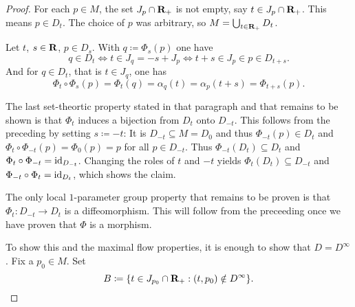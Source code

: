 \begin{proof}
  For
  each $p \in M$, the set $J_p \cap \mathbf{R}_+$ is not empty, say $t \in J_p
  \cap \mathbf{R}_+$. This means $p \in D_t$. The choice of $p$ was arbitrary, so
  $M = \bigcup_{t \in \mathbf{R}_+} D_t$.
  
  Let $t$, $s \in \mathbf{R}$, $p \in D_s$. With $q \coloneqq \Phi_s(p)$ one have
  \[
    q \in D_t \iff t \in J_q = -s + J_p \iff t + s \in J_p \in p \in D_{t + s}.
  \]
  And for $q \in D_t$, that is $t \in J_q$, one has
  \[
    \Phi_t \circ \Phi_s(p) = \Phi_t(q) = \alpha_q(t) = \alpha_p(t + s)
    = \Phi_{t + s}(p).
  \]
  
  The last set-theortic property stated in that paragraph and that remains to
  be shown is that $\Phi_t$ induces a bijection from $D_t$ onto $D_{-t}$. This
  follows from the preceding by setting $s \coloneqq -t$: It is
  $D_{-t} \subseteq M = D_0$ and thus $\Phi_{-t}(p) \in D_t$ and $\Phi_t
  \circ \Phi_{-t}(p) = \Phi_0(p) = p$ for all $p \in D_{-t}$. Thus
  $\Phi_{-t}(D_t) \subseteq D_t$ and $\Phi_t \circ \Phi_{-t} = \mathrm{id}_{D_{-t}}$.
  Changing the roles of $t$ and $-t$ yields $\Phi_t(D_t) \subseteq D_{-t}$ and
  $\Phi_{-t} \circ \Phi_t = \mathrm{id}_{D_t}$, which shows the claim. 
  
  The only local $1$-parameter group property that remains to be proven is that
  $\Phi_t\colon D_{-t} \to D_t$ is a diffeomorphism. This will follow from the
  preceeding once we have proven that $\Phi$ is a morphism.
  
  To show this and the maximal flow properties, it is enough to show that
  $D = D^\infty$. Fix a $p_0 \in M$. Set
  \[
    B \coloneqq \lbrace t \in J_{p_0} \cap \mathbf{R}_+: (t, p_0) \notin D^\infty\rbrace.
  \]
  

\end{proof}
